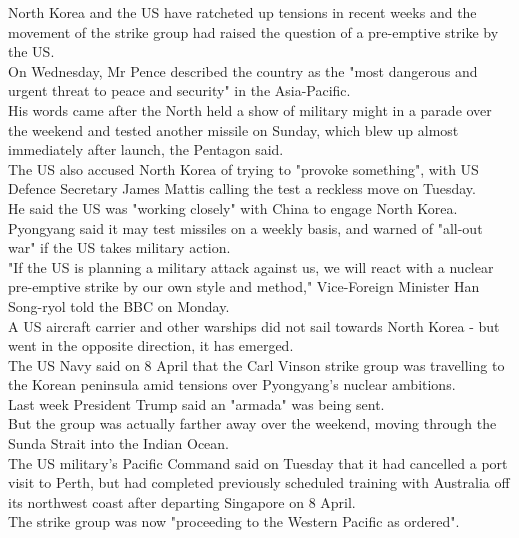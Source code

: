 \documentclass[runningheads,a4paper]{llncs}
\begin{document}
\begin{CJK*}{UTF8}{gbsn}
North Korea and the US have ratcheted up tensions in recent weeks and the movement of the strike group had raised the question of a pre-emptive strike by the US.\\
On Wednesday, Mr Pence described the country as the "most dangerous and urgent threat to peace and security" in the Asia-Pacific.\\
His words came after the North held a show of military might in a parade over the weekend and tested another missile on Sunday, which blew up almost immediately after launch, the Pentagon said.\\
The US also accused North Korea of trying to "provoke something", with US Defence Secretary James Mattis calling the test a reckless move on Tuesday.\\
He said the US was "working closely" with China to engage North Korea.\\
Pyongyang said it may test missiles on a weekly basis, and warned of "all-out war" if the US takes military action.\\
"If the US is planning a military attack against us, we will react with a nuclear pre-emptive strike by our own style and method," Vice-Foreign Minister Han Song-ryol told the BBC on Monday.\\
A \colorbox{green!30}{US} \colorbox{green!30}{aircraft carrier} and other \colorbox{red!30}{warships} did not sail towards \colorbox{green!30}{North Korea} - but went in the opposite direction, it has emerged.\\
The \colorbox{green!30}{US}\colorbox{blue!30}{ Navy} said on 8 April that the \colorbox{red!30}{Carl Vinson strike group} was travelling to the Korean peninsula amid tensions over Pyongyang's nuclear ambitions.\\
Last week \colorbox{blue!30}{President Trump} said an "armada" was being sent.\\
But the group was actually farther away over the weekend, moving through \colorbox{blue!30}{the }\colorbox{green!30}{Sunda Strait} into the \colorbox{red!30}{Indian Ocean}.\\
The \colorbox{green!30}{US} military's \colorbox{blue!30}{Pacific }\colorbox{green!30}{Command} said on Tuesday that it had cancelled a port visit to\colorbox{red!30}{ }\colorbox{green!30}{Perth}, but had completed previously scheduled training with \colorbox{blue!30}{Australia} off its northwest coast after departing \colorbox{green!30}{Singapore} on 8 April.\\
The strike group was now "proceeding to \colorbox{blue!30}{the Western Pacific} as ordered".\\

\end{CJK*}
\end{document}
